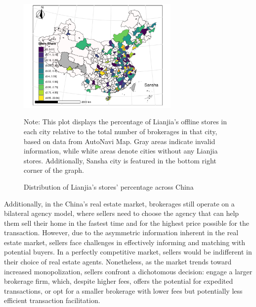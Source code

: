 \documentclass[11pt]{article}
\begin{document}
\begin{figure}[H]
  \centering
  \includegraphics[width=0.7\textwidth]{../figures/distribution_of_cities_share.pdf}
  \caption{Distribution of Lianjia's stores' percentage across China}
  \label{fig:precise_proportion_contraction}
  Note: This plot displays the percentage of Lianjia's offline stores in each city relative to the total number of brokerages in that city, based on data from AutoNavi Map. Gray areas indicate invalid information, while white areas denote cities without any Lianjia stores. Additionally, Sansha city is featured in the bottom right corner of the graph.
\end{figure}

Additionally, in the China's real estate market, brokerages still operate on a bilateral agency model, where sellers need to choose the agency that can help them sell their home in the fastest time and for the highest price possible for the transaction. However, due to the asymmetric information inherent in the real estate market, sellers face challenges in effectively informing and matching with potential buyers. In a perfectly competitive market, sellers would be indifferent in their choice of real estate agents. Nonetheless, as the market trends toward increased monopolization, sellers confront a dichotomous decision: engage a larger brokerage firm, which, despite higher fees, offers the potential for expedited transactions, or opt for a smaller brokerage with lower fees but potentially less efficient transaction facilitation.
\end{document}
